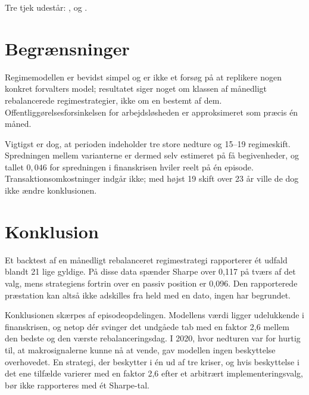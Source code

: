 \documentclass[11pt,a4paper]{article}
\begin{document}
Tre tjek udestår: ,  og
.

\section{Begrænsninger}
Regimemodellen er bevidst simpel og er ikke et forsøg på at replikere nogen
konkret forvalters model; resultatet siger noget om klassen af månedligt
rebalancerede regimestrategier, ikke om en bestemt af dem.
Offentliggørelsesforsinkelsen for arbejdsløsheden er approksimeret som præcis
én måned.

Vigtigst er dog, at perioden indeholder tre store nedture og 15--19
regimeskift. Spredningen mellem varianterne er dermed selv estimeret på få
begivenheder, og tallet $0{,}046$ for spredningen i finanskrisen hviler reelt
på én episode. Transaktionsomkostninger indgår ikke; med højst 19 skift over 23
år ville de dog ikke ændre konklusionen.

\section{Konklusion}
Et backtest af en månedligt rebalanceret regimestrategi rapporterer ét udfald
blandt 21 lige gyldige. På disse data spænder Sharpe over 0,117 på tværs af det
valg, mens strategiens fortrin over en passiv position er 0,096. Den
rapporterede præstation kan altså ikke adskilles fra held med en dato, ingen
har begrundet.

Konklusionen skærpes af episodeopdelingen. Modellens værdi ligger udelukkende i
finanskrisen, og netop dér svinger det undgåede tab med en faktor 2,6 mellem
den bedste og den værste rebalanceringsdag. I 2020, hvor nedturen var for
hurtig til, at makrosignalerne kunne nå at vende, gav modellen ingen
beskyttelse overhovedet. En strategi, der beskytter i én ud af tre kriser, og
hvis beskyttelse i det ene tilfælde varierer med en faktor 2,6 efter et
arbitrært implementeringsvalg, bør ikke rapporteres med ét Sharpe-tal.
\end{document}
